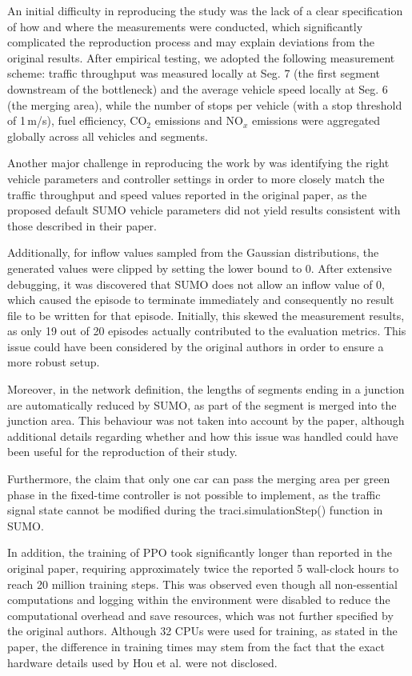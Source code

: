 
\medskip
An initial difficulty in reproducing the study was the lack of a clear specification of how and where the measurements were conducted, which significantly complicated the reproduction process and may explain deviations from the original results.
After empirical testing, we adopted the following measurement scheme: traffic throughput was measured locally at Seg. 7 (the first segment downstream of the bottleneck) and the average vehicle speed locally at Seg. 6 (the merging area), while the number of stops per vehicle (with a stop threshold of 1\,m/s), fuel efficiency, CO$_2$ emissions and NO$_x$ emissions were aggregated globally across all vehicles and segments.

\medskip
Another major challenge in reproducing the work by \cite{hou2021rampmeter} was identifying the right vehicle parameters and controller settings in order to more closely match the
traffic throughput and speed values reported in the original paper, as the proposed default SUMO vehicle parameters did not yield results consistent with those described in their paper.

\medskip
Additionally, for inflow values sampled from the Gaussian distributions, the generated values were clipped by setting the lower bound to 0. After extensive debugging, it was
discovered that SUMO does not allow an inflow value of 0, which caused the episode to terminate immediately and consequently no result file to be written for that episode.
Initially, this skewed the measurement results, as only 19 out of 20 episodes actually contributed to the evaluation metrics.
This issue could have been considered by the original authors in order to ensure a more robust setup.

\medskip
Moreover, in the network definition, the lengths of segments ending in a junction are automatically reduced by SUMO, as part of the segment is merged into the junction area.
This behaviour was not taken into account by the paper, although additional details regarding whether and how this issue was handled could have been useful for the reproduction of their study.

\medskip
Furthermore, the claim that only one car can pass the merging area per green phase in the fixed-time controller is not possible to implement, as the traffic signal state cannot be modified during the traci.simulationStep() function in SUMO.


\medskip
In addition, the training of PPO took significantly longer than reported in the original paper, requiring approximately twice the reported 5 wall-clock hours to reach 20 million training steps.
This was observed even though all non-essential computations and logging within the environment were disabled to reduce the computational overhead and save resources, which was not further specified by the original authors.
Although 32 CPUs were used for training, as stated in the paper, the difference in training times may stem from the fact that the exact hardware details used by Hou et al. were not disclosed.

